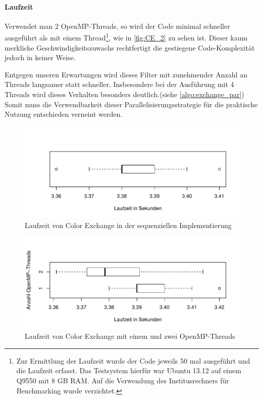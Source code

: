 \documentclass[10pt,a4paper]{article}
\begin{document}
\paragraph{Laufzeit}
Verwendet man 2 OpenMP-Threads, so wird der Code minimal schneller ausgeführt als mit einem Thread\footnote{Zur Ermittlung der Laufzeit wurde der Code jeweils 50 mal ausgeführt und die Laufzeit erfasst. Das Testsystem hierfür war Ubuntu 13.12 auf einem Q9550 mit 8 GB RAM. Auf die Verwendung des Institusrechners für Benchmarking wurde verzichtet.}, wie in \autoref{fig:CE_2} zu sehen ist. Dieser kaum merkliche Geschwindigkeitszuwachs rechtfertigt die gestiegene Code-Komplexität jedoch in keiner Weise.

Entgegen unseren Erwartungen wird dieses Filter mit zunehmender Anzahl an Threads langsamer statt schneller. Insbesondere bei der Ausführung mit 4 Threads wird dieses Verhalten besonders deutlich.(siehe \autoref{algo:exchange_par}) Somit muss die Verwendbarkeit dieser Parallelisierungsstrategie für die praktische Nutzung entschieden verneint werden.
\begin{figure}[H]
\centering
\includegraphics[scale=0.7]{graphs/seq.pdf}
\caption{Laufzeit von Color Exchange in der sequenziellen Implementierung}
\label{fig:CE_seq}
\end{figure}
\begin{figure}[H]
\centering
\includegraphics[scale=0.7]{graphs/diag_2threads.pdf}
\caption{Laufzeit von Color Exchange mit einem und zwei OpenMP-Threads}
\label{fig:CE_2}
\end{figure}
\end{document}
